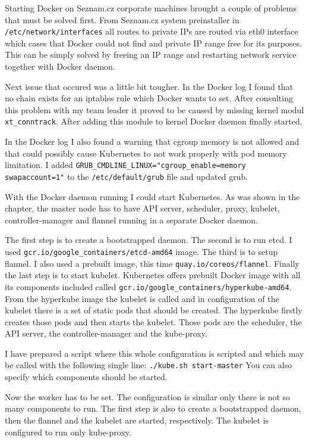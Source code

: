 Starting Docker on Seznam.cz corporate machines brought a couple of problems that must be solved first. From Seznam.cz system preinstaller in \lstinline{/etc/network/interfaces} all routes to private IPs are routed via eth0 interface which cases that Docker could not find and private IP range free for its purposes. This can be simply solved by freeing an IP range and restarting network service together with Docker daemon.

Next issue that occured was a little bit tougher. In the Docker log I found that no chain exists for an iptables rule which Docker wants to set. After consulting this problem with my team leader it proved to be caused by missing kernel modul \lstinline{xt_conntrack}. After adding this module to kernel Docker daemon finally started.

In the Docker log I also found a warning that cgroup memory is not allowed and that could possibly cause Kubernetes to not work properly with pod memory limitation. I added \lstinline{GRUB_CMDLINE_LINUX="cgroup_enable=memory swapaccount=1"} to the \lstinline{/etc/default/grub} file and updated grub.

With the Docker daemon running I could start Kubernetes. As was shown in the  chapter, the master node has to have API server, scheduler, proxy, kubelet, controller-manager and flannel running in a separate Docker daemon.

The first step is to create a bootstrapped daemon. The second is to run etcd. I used \lstinline{gcr.io/google_containers/etcd-amd64} image. The third is to setup flannel. I also used a prebuilt image, this time \lstinline{quay.io/coreos/flannel}. Finally the last step is to start kubelet. Kubernetes offers prebuilt Docker image with all its components included called \lstinline{gcr.io/google_containers/hyperkube-amd64}. From the hyperkube image the kubelet is called and in configuration of the kubelet there is a set of static pods that should be created. The hyperkube firstly creates those pods and then starts the kubelet. Those pods are the scheduler, the API server, the controller-manager and the kube-proxy.

I have prepared a script where this whole configuration is scripted and which may be called with the following single line: \lstinline{./kube.sh start-master} You can also specify which components should be started.

Now the worker has to be set. The configuration is similar only there is not so many components to run. The first step is also to create a bootstrapped daemon, then the flannel and the kubelet are started, respectively. The kubelet is configured to run only kube-proxy.

